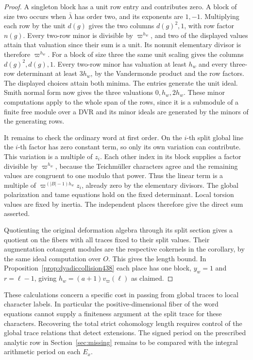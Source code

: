 \documentclass[a4paper,11pt]{article}
\theoremstyle{definition}
\theoremstyle{remark}
\numberwithin{equation}{section}
\begin{document}
\begin{proof}
A singleton block has a unit row entry and contributes zero.
A block of size two occurs when \(\bar\lambda\) has order two,
and its exponents are \(1,-1\). Multiplying each row by the
unit \(d(g)\) gives the two columns \(d(g)^2,1\), with row
factor \(n(g)\). Every two-row minor is divisible by
\(\varpi^{h_w}\), and two of the displayed values attain
that valuation since their sum is a unit. Its nonunit
elementary divisor is therefore \(\varpi^{h_w}\).
For a block of size three the same unit scaling gives the
columns \(d(g)^2,d(g),1\). Every two-row minor has valuation
at least \(h_w\) and every three-row determinant at least
\(3h_w\), by the Vandermonde product and the row factors.
The displayed choices attain both minima. The entries
generate the unit ideal. Smith normal form now gives the
three valuations \(0,h_w,2h_w\). These minor computations
apply to the whole span of the rows, since it is a submodule
of a finite free module over a DVR and its minor ideals
are generated by the minors of the generating rows.

It remains to check the ordinary word at first order.
On the \(i\)-th split global line the \(i\)-th factor has
zero constant term, so only its own variation can contribute.
This variation is a multiple of \(z_i\). Each other index
in its block supplies a factor divisible by \(\varpi^{h_w}\),
because the Teichm\"uller characters agree and the remaining
values are congruent to one modulo that power. Thus the linear
term is a multiple of \(\varpi^{(|B|-1)h_w}z_i\), already
zero by the elementary divisors. The global polarization
and tame equations hold on the fixed determinant. Local
torsion values are fixed by inertia. The independent places
therefore give the direct sum asserted.

Quotienting the original deformation algebra through its
split section gives a quotient on the fibers with all traces
fixed to their split values. Their augmentation cotangent
modules are the respective cokernels in the corollary, by
the same ideal computation over \(O\). This gives the length
bound. In Proposition~\ref{prop:dyadiccollision438} each
place has one block, \(y_w=1\) and \(r=\ell-1\), giving
\(h_w=(a+1)v_\varpi(\ell)\) as claimed.
\end{proof}

These calculations concern a specific cost in passing from
global traces to local character labels. In particular the
positive-dimensional fiber of the word equations cannot
supply a finiteness argument at the split trace for these
characters. Recovering the total strict cohomology length
requires control of the global trace relations that detect
extensions. The signed period on the prescribed analytic row
in Section~\ref{sec:missing} remains to be compared with the
integral arithmetic period on each \(E_x\).
\end{document}
